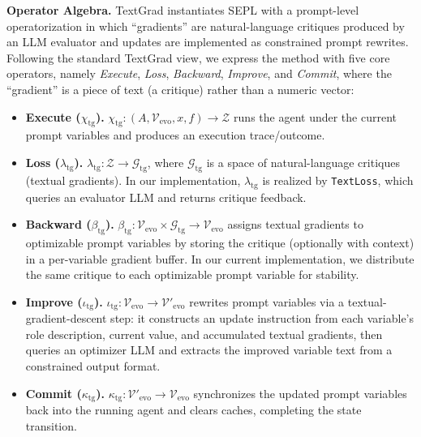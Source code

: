 \textbf{Operator Algebra.}
TextGrad instantiates SEPL with a prompt-level operatorization in which ``gradients'' are natural-language critiques produced by an LLM evaluator and updates are implemented as constrained prompt rewrites.
Following the standard TextGrad view, we express the method with five core operators, namely \emph{Execute}, \emph{Loss}, \emph{Backward}, \emph{Improve}, and \emph{Commit}, where the ``gradient'' is a piece of text (a critique) rather than a numeric vector:
\begin{itemize}[leftmargin=1em, itemsep=0em, parsep=0em, topsep=0em, partopsep=0em]
  \item \textbf{Execute ($\chi_{\mathrm{tg}}$).} $\chi_{\mathrm{tg}}: (A, \mathcal{V}_{\text{evo}}, x, f) \rightarrow \mathcal{Z}$ runs the agent under the current prompt variables and produces an execution trace/outcome.
  \item \textbf{Loss ($\lambda_{\mathrm{tg}}$).} $\lambda_{\mathrm{tg}}: \mathcal{Z} \rightarrow \mathcal{G}_{\mathrm{tg}}$, where $\mathcal{G}_{\mathrm{tg}}$ is a space of natural-language critiques (textual gradients). In our implementation, $\lambda_{\mathrm{tg}}$ is realized by \texttt{TextLoss}, which queries an evaluator LLM and returns critique feedback.
  \item \textbf{Backward ($\beta_{\mathrm{tg}}$).} $\beta_{\mathrm{tg}}: \mathcal{V}_{\text{evo}} \times \mathcal{G}_{\mathrm{tg}} \rightarrow \mathcal{V}_{\text{evo}}$ assigns textual gradients to optimizable prompt variables by storing the critique (optionally with context) in a per-variable gradient buffer. In our current implementation, we distribute the same critique to each optimizable prompt variable for stability.
  \item \textbf{Improve ($\iota_{\mathrm{tg}}$).} $\iota_{\mathrm{tg}}: \mathcal{V}_{\text{evo}} \rightarrow \mathcal{V}'_{\text{evo}}$ rewrites prompt variables via a textual-gradient-descent step: it constructs an update instruction from each variable's role description, current value, and accumulated textual gradients, then queries an optimizer LLM and extracts the improved variable text from a constrained output format.
  \item \textbf{Commit ($\kappa_{\mathrm{tg}}$).} $\kappa_{\mathrm{tg}}: \mathcal{V}'_{\text{evo}} \rightarrow \mathcal{V}_{\text{evo}}$ synchronizes the updated prompt variables back into the running agent and clears caches, completing the state transition.
\end{itemize}


